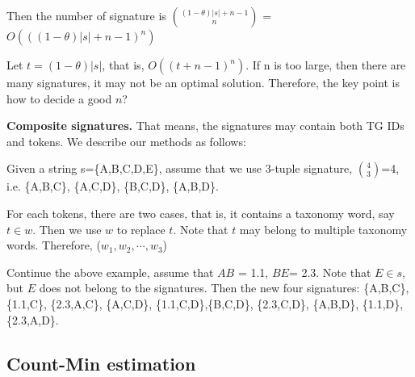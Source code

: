 \documentclass{sig-alternate}
\begin{document}
Then the number of signature is  $\binom{(1-\theta)|s|+n-1}{n}$ = $O(((1-\theta)|s|+n-1)^{n})$

Let $t= (1-\theta)|s|$, that is, $O((t+n-1)^{n})$. If n is too large, then there are many signatures, it may not be an optimal solution. Therefore, the key point is how to decide a good $n$?

\smallskip

\noindent \textbf{Composite signatures.} That means, the signatures may contain both TG IDs and tokens. We describe our methods as follows:

 Given a string s=\{A,B,C,D,E\}, assume that we use 3-tuple signature, $\binom{4}{3}$=4, i.e. \{A,B,C\}, \{A,C,D\}, \{B,C,D\}, \{A,B,D\}.

For each tokens, there are two cases, that is, it contains a taxonomy word, say $t \in w$. Then we use $w$ to replace $t$. Note that $t$ may belong to multiple taxonomy words. Therefore, ($w_1, w_2, \cdots, w_3$)

Continue the above example, assume that $AB$ = 1.1, $BE$= 2.3. Note that $E \in s $, but $E$ does not belong to the signatures. Then the new four signatures: \{A,B,C\}, \{1.1,C\}, \{2.3,A,C\}, \{A,C,D\}, \{1.1,C,D\},\{B,C,D\},  \{2.3,C,D\}, \{A,B,D\}, \{1.1,D\}, \{2.3,A,D\}.




\subsection{Count-Min estimation}
\end{document}

